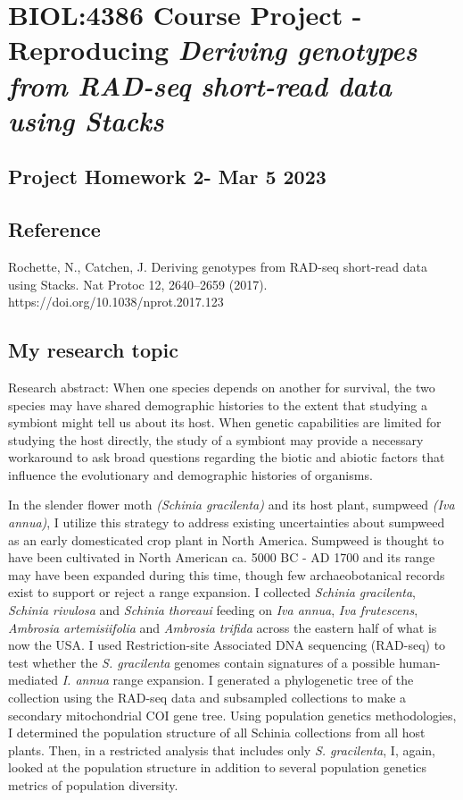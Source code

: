\section{BIOL:4386 Course Project - Reproducing \emph{Deriving genotypes
from RAD-seq short-read data using
Stacks}}\label{biol4386-course-project---reproducing-deriving-genotypes-from-rad-seq-short-read-data-using-stacks}

\subsection{Project Homework 2- Mar 5
2023}\label{project-homework-2--mar-5-2023}

\subsection{Reference}\label{reference}

Rochette, N., Catchen, J. Deriving genotypes from RAD-seq short-read
data using Stacks. Nat Protoc 12, 2640--2659 (2017).
https://doi.org/10.1038/nprot.2017.123

\subsection{My research topic}\label{my-research-topic}

Research abstract: When one species depends on another for survival, the
two species may have shared demographic histories to the extent that
studying a symbiont might tell us about its host. When genetic
capabilities are limited for studying the host directly, the study of a
symbiont may provide a necessary workaround to ask broad questions
regarding the biotic and abiotic factors that influence the evolutionary
and demographic histories of organisms.

In the slender flower moth \emph{(Schinia gracilenta)} and its host
plant, sumpweed \emph{(Iva annua)}, I utilize this strategy to address
existing uncertainties about sumpweed as an early domesticated crop
plant in North America. Sumpweed is thought to have been cultivated in
North American ca. 5000 BC - AD 1700 and its range may have been
expanded during this time, though few archaeobotanical records exist to
support or reject a range expansion. I collected \emph{Schinia
gracilenta}, \emph{Schinia rivulosa} and \emph{Schinia thoreaui} feeding
on \emph{Iva annua}, \emph{Iva frutescens}, \emph{Ambrosia
artemisiifolia} and \emph{Ambrosia trifida} across the eastern half of
what is now the USA. I used Restriction-site Associated DNA sequencing
(RAD-seq) to test whether the \emph{S. gracilenta} genomes contain
signatures of a possible human-mediated \emph{I. annua} range expansion.
I generated a phylogenetic tree of the collection using the RAD-seq data
and subsampled collections to make a secondary mitochondrial COI gene
tree. Using population genetics methodologies, I determined the
population structure of all Schinia collections from all host plants.
Then, in a restricted analysis that includes only \emph{S. gracilenta},
I, again, looked at the population structure in addition to several
population genetics metrics of population diversity.

